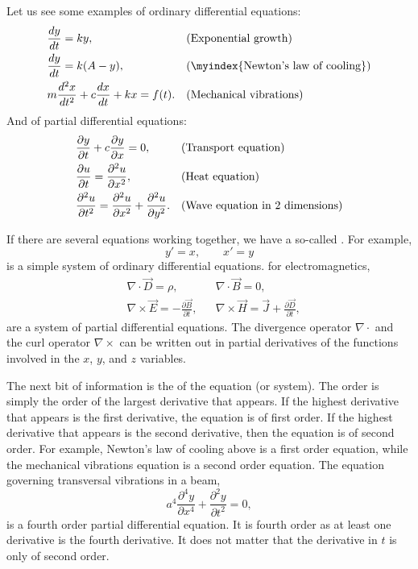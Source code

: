 Let us see some examples of ordinary differential equations:
\begin{align*}
& \frac{d y}{dt} = ky , & & \text{(Exponential growth\index{exponential growth})} \\
& \frac{d y}{dt} = k(A-y) , & & \text{(\myindex{Newton's law of cooling})} \\
& m \frac{d^2 x}{dt^2} + c \frac{dx}{dt} + kx = f(t) . & &
\text{(Mechanical vibrations\index{mechanical vibrations})}
\end{align*}
And of partial differential equations:
\begin{align*}
& \frac{\partial y}{\partial t} + c \frac{\partial y}{\partial x} = 0 , & & 
\text{(Transport equation\index{transport equation})} \\
& \frac{\partial u}{\partial t} = \frac{\partial^2 u}{\partial x^2} , & & 
\text{(Heat equation\index{heat equation})} \\
& \frac{\partial^2 u}{\partial t^2} = \frac{\partial^2 u}{\partial x^2} +
\frac{\partial^2 u}{\partial y^2} . & & 
\text{(Wave equation in 2 dimensions\index{wave equation in 2 dimensions})}
\end{align*}

If there are several equations working together, we have a so-called
\emph{}.  For example,
\begin{equation*}
y' = x , \qquad x' = y
\end{equation*}
is a simple system of ordinary differential equations.
 for electromagnetics,
\begin{align*}
& \nabla \cdot \vec{D} = \rho, & & \nabla \cdot \vec{B} = 0 , \\
& \nabla \times \vec{E} = - \frac{\partial \vec{B}}{\partial t}, &
& \nabla \times \vec{H} = \vec{J} + \frac{\partial \vec{D}}{\partial t} ,
\end{align*}
are a system of partial differential equations. 
The divergence operator $\nabla \cdot$ and the
curl operator $\nabla \times$ can be written out in partial derivatives of
the functions involved in the $x$, $y$, and $z$ variables.

\medskip

The next bit of information is the \emph{} of the
equation (or system).  The order is simply the order of the largest
derivative that appears.  If the highest derivative that appears is
the first derivative, the equation is of first order.  If the highest
derivative that appears is the second derivative, then the equation is of second
order.  For example, Newton's law of cooling above is a first order
equation, while the mechanical vibrations equation is a second order equation.
The equation governing transversal vibrations in a beam,
\begin{equation*}
a^4 \frac{\partial^4 y}{\partial x^4} + \frac{\partial^2 y}{\partial t^2} = 0,
\end{equation*}
is a fourth order partial differential equation.  It is
fourth order as at least one derivative is the fourth derivative.  It
does not matter that the derivative in $t$ is only of second order.

